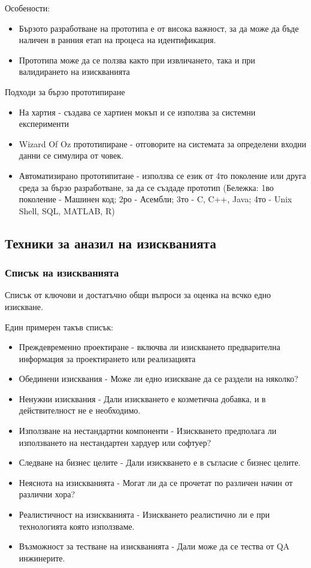 \documentclass[fleqn,12pt]{article}
\begin{document}
 Особености:
\begin{itemize}
	\item Бързото разработване на прототипа е от висока важност, за да може да бъде наличен в ранния етап на процеса на идентификация.
	\item Прототипа може да се ползва както при извличането, така и при валидирането на изискванията
\end{itemize}


 Подходи за бързо прототипиране
\begin{itemize}
	\item На хартия - създава се хартиен мокъп и се използва за системни експерименти
	\item Wizard Of Oz прототипиране - отговорите на системата за определени входни данни се симулира от човек.
	\item Автоматизирано прототипитане - използва се език от 4то поколение или друга среда за бързо разработване, за да се създаде прототип
	(Бележка: 1во поколение - Машинен код; 2ро - Асембли; 3то - C, C++, Java; 4то - Unix Shell, SQL, MATLAB, R)
\end{itemize}


\subsection{Техники за аназил на изискванията}

\subsubsection{Списък на изискванията}
Списък от ключови и достатъчно общи въпроси за оценка на всчко едно изискване.

Един примерен такъв списък:
\begin{itemize}
	\item Преждевременно проектиране - включва ли изискването предварителна информация за проектирането или реализацията
	\item Обединени изисквания - Може ли едно изискване да се раздели на няколко?
	\item Ненужни изисквания - Дали изискването е козметична добавка, и в действителност не е необходимо.
	\item Използване на нестандартни компоненти - Изискването предполага ли използването на нестандартен хардуер или софтуер?
	\item Следване на бизнес целите - Дали изискването е в съгласие с бизнес целите.
	\item Неяснота на изискванията - Могат ли да се прочетат по различен начин от различни хора?
	\item Реалистичност на изискванията - Изискването реалистично ли е при технологията която използваме.
	\item Възможност за тестване на изискванията - Дали може да се тества от QA инжинерите.
\end{itemize}
\end{document}
